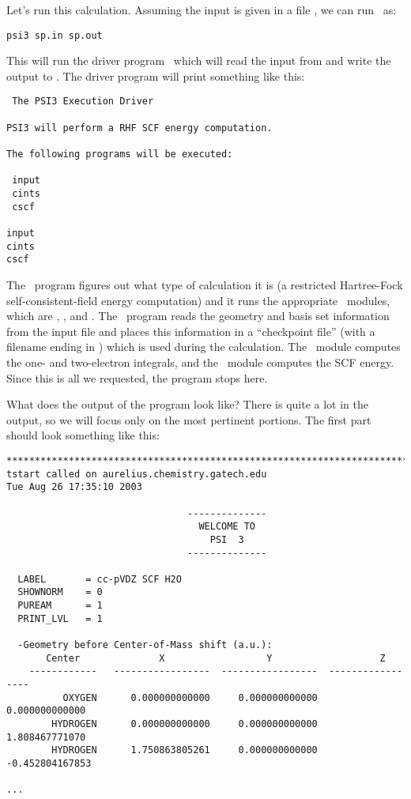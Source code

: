 Let's run this calculation.  Assuming the input is given in a file
, we can run \PSIthree\ as:
\begin{verbatim}
psi3 sp.in sp.out
\end{verbatim}

This will run the driver program \PSIdriver\, which will read the
input from  and write the output to .  
The driver program will print something like this:
\begin{verbatim}
 The PSI3 Execution Driver
 
PSI3 will perform a RHF SCF energy computation.
 
The following programs will be executed:
 
 input
 cints
 cscf
 
input
cints
cscf
\end{verbatim}
The \PSIdriver\ program figures out what type of calculation it is
(a restricted Hartree-Fock self-consistent-field energy computation)
and it runs the appropriate \PSIthree\ modules, which are 
\PSIinput, \PSIcints, and \PSIcscf.  The \PSIinput\ program reads
the geometry and basis set information from the input file and
places this information in a ``checkpoint file'' (with a filename
ending in ) which is used
during the calculation.  The \PSIcints\ module computes the one- and
two-electron integrals, and the \PSIcscf\ module computes the 
SCF energy.  Since this is all we requested, the program stops here.

What does the output of the program look like?  There is quite a lot
in the output, so we will focus only on the most pertinent portions.
The first part should look something like this:
\begin{verbatim}
******************************************************************************
tstart called on aurelius.chemistry.gatech.edu
Tue Aug 26 17:35:10 2003
                                                                                
                                --------------
                                  WELCOME TO
                                    PSI  3
                                --------------
                                                                                
  LABEL       = cc-pVDZ SCF H2O
  SHOWNORM    = 0
  PUREAM      = 1
  PRINT_LVL   = 1
                                                                                
  -Geometry before Center-of-Mass shift (a.u.):
       Center              X                  Y                   Z
    ------------   -----------------  -----------------  -----------------
          OXYGEN      0.000000000000     0.000000000000     0.000000000000
        HYDROGEN      0.000000000000     0.000000000000     1.808467771070
        HYDROGEN      1.750863805261     0.000000000000    -0.452804167853
                                                                                
...
\end{verbatim}

